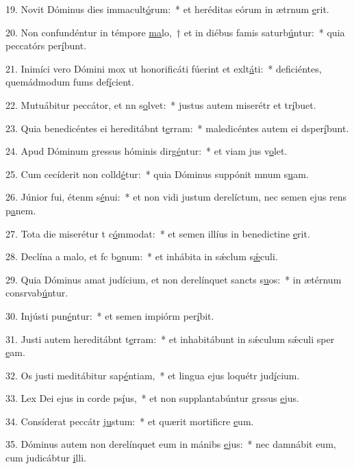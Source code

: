 19. Novit Dóminus dies immacult\uline{ó}rum:~* et heréditas eórum in ætrnum \uline{e}rit.\par 
20. Non confundéntur in témpore \uline{ma}lo,~† et in diébus famis saturb\uline{ú}ntur:~* quia peccatórs per\uline{í}bunt.\par 
21. Inimíci vero Dómini mox ut honorificáti fúerint et exlt\uline{á}ti:~* deficiéntes, quemádmodum fums def\uline{í}cient.\par 
22. Mutuábitur peccátor, et nn s\uline{o}lvet:~* justus autem miserétr et tr\uline{í}buet.\par 
23. Quia benedicéntes ei hereditábnt t\uline{e}rram:~* maledicéntes autem ei dsper\uline{í}bunt.\par 
24. Apud Dóminum gressus hóminis dirg\uline{é}ntur:~* et viam jus v\uline{o}let.\par 
25. Cum cecíderit non colld\uline{é}tur:~* quia Dóminus suppónit mnum s\uline{u}am.\par 
26. Júnior fui, étenm s\uline{é}nui:~* et non vidi justum derelíctum, nec semen ejus rens p\uline{a}nem.\par 
27. Tota die miserétur t c\uline{ó}mmodat:~* et semen illíus in benedictine \uline{e}rit.\par 
28. Declína a malo, et fc b\uline{o}num:~* et inhábita in sǽclum s\uline{ǽ}culi.\par 
29. Quia Dóminus amat judícium, et non derelínquet sancts s\uline{u}os:~* in ætérnum consrvab\uline{ú}ntur.\par 
30. Injústi pun\uline{é}ntur:~* et semen impiórm per\uline{í}bit.\par 
31. Justi autem hereditábnt t\uline{e}rram:~* et inhabitábunt in sǽculum sǽculi sper \uline{e}am.\par 
32. Os justi meditábitur sap\uline{é}ntiam,~* et lingua ejus loquétr jud\uline{í}cium.\par 
33. Lex Dei ejus in corde ps\uline{í}us,~* et non supplantabúntur grssus \uline{e}jus.\par 
34. Consíderat peccátr j\uline{u}stum:~* et quærit mortificre \uline{e}um.\par 
35. Dóminus autem non derelínquet eum in mánibs \uline{e}jus:~* nec damnábit eum, cum judicábtur \uline{i}lli.\par 

